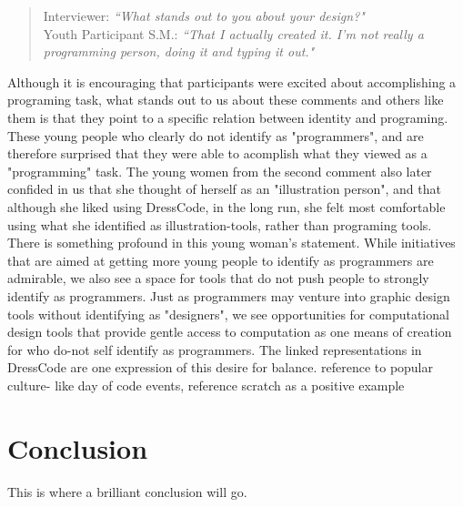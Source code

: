 \documentclass{sigchi}
\begin{document}
 \begin{quotation}
 Interviewer:  \textit{``What stands out to you about your design?"}
 \\Youth Participant S.M.: \textit{``That I actually created it. I'm not really a programming person, doing it and typing it out."}
 \end{quotation}

Although it is encouraging that participants were excited about accomplishing a programing task, what stands out to us about these comments and others like them is that they point to a specific relation between identity and programing. These young people who clearly do not identify as "programmers", and are therefore surprised that they were able to acomplish what they viewed as a "programming" task. The young women from the second comment also later confided in us that she thought of herself as an "illustration person", and that although she liked using DressCode, in the long run, she felt most comfortable using what she identified as illustration-tools, rather than programing tools. 
There is something profound in this young woman's statement. While initiatives that are aimed at getting more young people to identify as programmers are admirable, we also see a space for tools that do not push people to strongly identify as programmers. Just as programmers may venture into graphic design tools without identifying as "designers", we see opportunities for computational design tools that provide gentle access to computation as one means of creation for who do-not self identify as programmers. The linked representations in DressCode are one expression of this desire for balance.
reference to popular culture- like day of code events, reference scratch as a positive example

\section{Conclusion}
This is where a brilliant conclusion will go.



\end{document}
